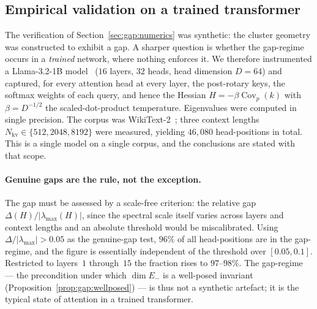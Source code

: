 \subsection{Empirical validation on a trained transformer}
\label{sec:gap:empirical}

The verification of Section~\ref{sec:gap:numerics} was synthetic: the
cluster geometry was constructed to exhibit a gap.  A sharper question is
whether the gap-regime occurs in a \emph{trained} network, where nothing
enforces it.  We therefore instrumented a Llama-3.2-1B model~\cite{grattafiori2024llama}
($16$ layers, $32$ heads, head dimension $D=64$) and captured, for every
attention head at every layer, the post-rotary keys, the softmax weights of
each query, and hence the Hessian $H=-\beta\operatorname{Cov}_p(k)$ with
$\beta=D^{-1/2}$ the scaled-dot-product temperature.  Eigenvalues were
computed in single precision.  The corpus was WikiText-2~\cite{merity2017pointer}; three context
lengths $N_{\mathrm{kv}}\in\{512,2048,8192\}$ were measured, yielding
$46{,}080$ head-positions in total.  This is a single model on a single
corpus, and the conclusions are stated with that scope.

\paragraph{Genuine gaps are the rule, not the exception.}
The gap must be assessed by a scale-free criterion: the relative gap
$\Delta(H)/|\lambda_{\max}(H)|$, since the spectral scale itself varies
across layers and context lengths and an absolute threshold would be
miscalibrated.  Using $\Delta/|\lambda_{\max}|>0.05$ as the genuine-gap
test, $96\%$ of all head-positions are in the gap-regime, and the figure is
essentially independent of the threshold over $[0.05,0.1]$.  Restricted to
layers~$1$ through~$15$ the fraction rises to $97\text{--}98\%$.  The
gap-regime --- the precondition under which $\dim E_-$ is a well-posed
invariant (Proposition~\ref{prop:gap:wellposed}) --- is thus not a
synthetic artefact; it is the typical state of attention in a trained
transformer.


